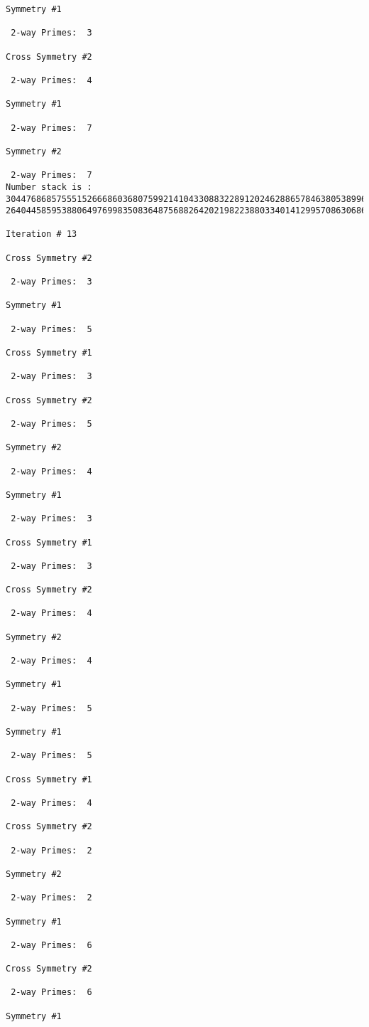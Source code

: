 \begin{verbatim}
Symmetry #1

 2-way Primes: 	3

Cross Symmetry #2

 2-way Primes: 	4

Symmetry #1

 2-way Primes: 	7

Symmetry #2

 2-way Primes: 	7
Number stack is :
30447686857555152666860368075992141043308832289120246288657846380538996794608835958544046240163340857
26404458595388064976998350836487568826420219822388033401412995708630686662515557586867440375804336104

Iteration #	13

Cross Symmetry #2

 2-way Primes: 	3

Symmetry #1

 2-way Primes: 	5

Cross Symmetry #1

 2-way Primes: 	3

Cross Symmetry #2

 2-way Primes: 	5

Symmetry #2

 2-way Primes: 	4

Symmetry #1

 2-way Primes: 	3

Cross Symmetry #1

 2-way Primes: 	3

Cross Symmetry #2

 2-way Primes: 	4

Symmetry #2

 2-way Primes: 	4

Symmetry #1

 2-way Primes: 	5

Symmetry #1

 2-way Primes: 	5

Cross Symmetry #1

 2-way Primes: 	4

Cross Symmetry #2

 2-way Primes: 	2

Symmetry #2

 2-way Primes: 	2

Symmetry #1

 2-way Primes: 	6

Cross Symmetry #2

 2-way Primes: 	6

Symmetry #1


\end{verbatim}
